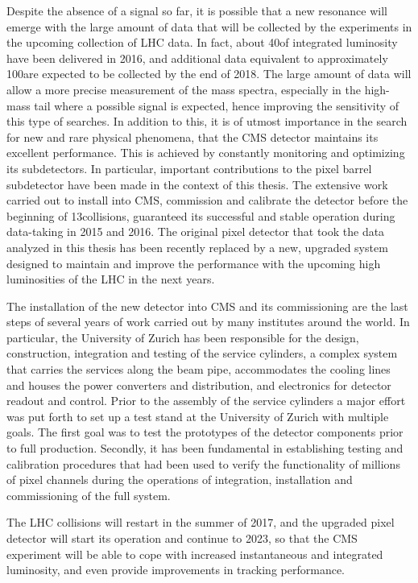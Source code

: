 Despite the absence of a signal so far, it is possible that a new resonance will emerge with the large amount of data that will be collected by the experiments in the upcoming collection of LHC data.
In fact, about 40\fbinv of integrated luminosity have been delivered in 2016, and additional data equivalent to approximately 100\fbinv are expected to be collected by the end of 2018.
The large amount of data will allow a more precise measurement of the mass spectra, especially in the high-mass tail where a possible signal is expected, hence improving the sensitivity of this type of searches.
In addition to this, it is of utmost importance in the search for new and rare physical phenomena, that the CMS detector maintains its excellent performance.
This is achieved by constantly monitoring and optimizing its subdetectors. In particular, important contributions to the pixel barrel subdetector have been made in the context of this thesis.
The extensive work carried out to install into CMS, commission and calibrate the detector before the beginning of 13\TeV collisions, guaranteed its successful and stable operation during data-taking in 2015 and 2016.
The original pixel detector that took the data analyzed in this thesis has been recently replaced by a new, upgraded system designed to maintain and improve the performance with the upcoming high luminosities of the LHC in the next years.

The installation of the new detector into CMS and its commissioning are the last steps of several years of work carried out by many institutes around the world. In particular, the University of Zurich has been responsible for the design, construction, integration and testing of the service cylinders, a complex system that carries the services along the beam pipe, accommodates the cooling lines and houses the power converters and distribution, and electronics for detector readout and control.
Prior to the assembly of the service cylinders a major effort was put forth to set up a test stand at the University of Zurich with multiple goals. The first goal was to test the prototypes of the detector components prior to full production. Secondly, it has been fundamental in establishing testing and calibration procedures that had been used to verify the functionality of millions of pixel channels during the operations of integration, installation and commissioning of the full system.

The LHC collisions will restart in the summer of 2017, and the upgraded pixel detector will start its operation and continue to 2023, so that the CMS experiment will be able to cope with increased instantaneous and integrated luminosity, and even provide improvements in tracking performance.